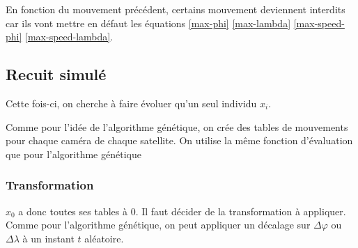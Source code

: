 \documentclass[11pt, oneside]{article}   	%
\begin{document}
En fonction du mouvement précédent, certains mouvement deviennent interdits car
ils vont mettre en défaut les équations \eqref{max-phi} \eqref{max-lambda}
\eqref{max-speed-phi} \eqref{max-speed-lambda}.

\subsection{Recuit simulé}

Cette fois-ci, on cherche à faire évoluer qu'un seul individu $x_i$.

Comme pour l'idée de l'algorithme génétique, on crée des tables de
mouvements pour chaque caméra de chaque satellite.
On utilise la même fonction d'évaluation que pour l'algorithme génétique

\subsubsection{Transformation}

$x_0$ a donc toutes ses tables à 0. Il faut décider de la transformation à
appliquer. Comme pour l'algorithme génétique, on peut appliquer un décalage sur
$\Delta\varphi$ ou $\Delta\lambda$ à un instant $t$ aléatoire.
\end{document}
